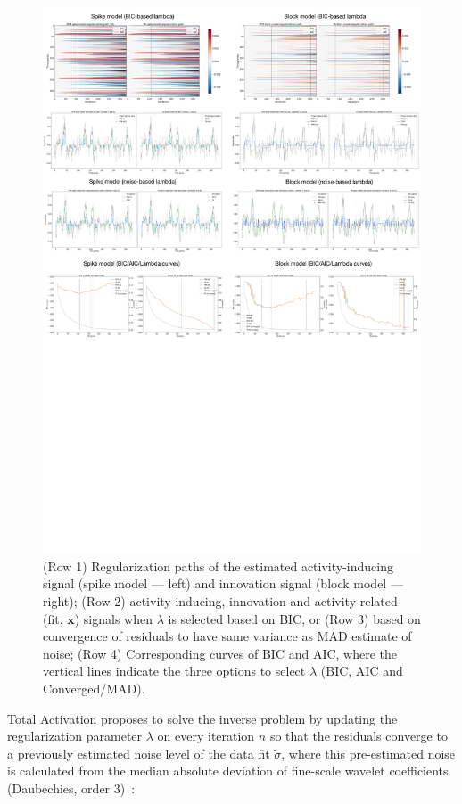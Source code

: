 \begin{figure}[t!]
    \begin{center}
        \includegraphics[width=\textwidth]{figures/exp.pdf}
    \end{center}
    \caption{(Row 1) Regularization paths of the estimated activity-inducing signal (spike model --- left) and innovation signal (block model --- right); (Row 2) activity-inducing, innovation and activity-related (fit, \(\mathbf{x}\)) signals when \(\lambda\) is selected based on BIC, or (Row 3) based on convergence of residuals to have same variance as MAD estimate of noise; (Row 4) Corresponding curves of BIC and AIC, where the vertical lines indicate the three options to select \(\lambda\) (BIC, AIC and Converged/MAD).}
\label{fig:exp}
\end{figure}

Total Activation proposes to solve the inverse problem by updating the regularization parameter \(\lambda\) on every iteration \(n\) so that the residuals converge to a previously estimated noise level of the data fit \(\tilde{\sigma}\), where this pre-estimated noise is calculated from the median absolute deviation of fine-scale wavelet coefficients (Daubechies, order 3)~\cite{karahanouglu2013total}:

